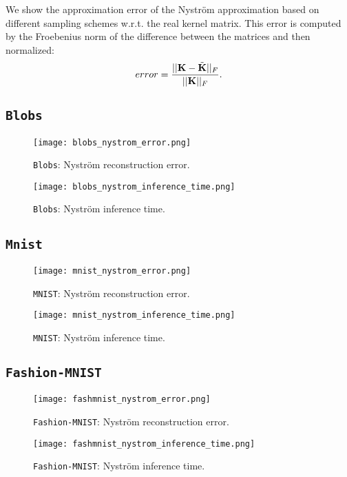 We show the approximation error of the Nyström approximation based on different sampling schemes w.r.t. the real kernel matrix. This error is computed by the Froebenius norm of the difference between the matrices and then normalized:
\begin{equation}
 error = \frac{||{\mathbf{K}} - \tilde{{\mathbf{K}}}||_F}{||{\mathbf{K}}||_F}.
\end{equation}


\subsection{\texttt{Blobs}           }
\begin{figure*}[h]
\begin{subfigure}[]{.49\textwidth}
\texttt{[image: blobs\_nystrom\_error.png]}
\caption{\texttt{Blobs}: Nyström reconstruction error.}
\label{fig:blobs:nystrom_error}
\end{subfigure}
\begin{subfigure}[]{.49\textwidth}
\texttt{[image: blobs\_nystrom\_inference\_time.png]}
\caption{\texttt{Blobs}: Nyström inference time.}
\label{fig:blobs:nystrom_time}
\end{subfigure}
\end{figure*}
\FloatBarrier
\subsection{\texttt{Mnist}           }
\begin{figure*}[h]
\begin{subfigure}[]{.49\textwidth}
\texttt{[image: mnist\_nystrom\_error.png]}
\caption{\texttt{MNIST}: Nyström reconstruction error.}
\label{fig:mnist:nystrom_error}
\end{subfigure}
\begin{subfigure}[]{.49\textwidth}
\texttt{[image: mnist\_nystrom\_inference\_time.png]}
\caption{\texttt{MNIST}: Nyström inference time.}
\label{fig:mnist:nystrom_time}
\end{subfigure}
\end{figure*}
\FloatBarrier
\subsection{\texttt{Fashion-MNIST}}
\begin{figure*}[h]
 \begin{subfigure}[]{.49\textwidth}
\texttt{[image: fashmnist\_nystrom\_error.png]}
\caption{\texttt{Fashion-MNIST}: Nyström reconstruction error.}
\label{fig:fashmnist:nystrom_error}
\end{subfigure}
\begin{subfigure}[]{.49\textwidth}
\texttt{[image: fashmnist\_nystrom\_inference\_time.png]}
\caption{\texttt{Fashion-MNIST}: Nyström inference time.}
\label{fig:fashmnist:nystrom_time}
\end{subfigure}
\end{figure*}
\FloatBarrier

